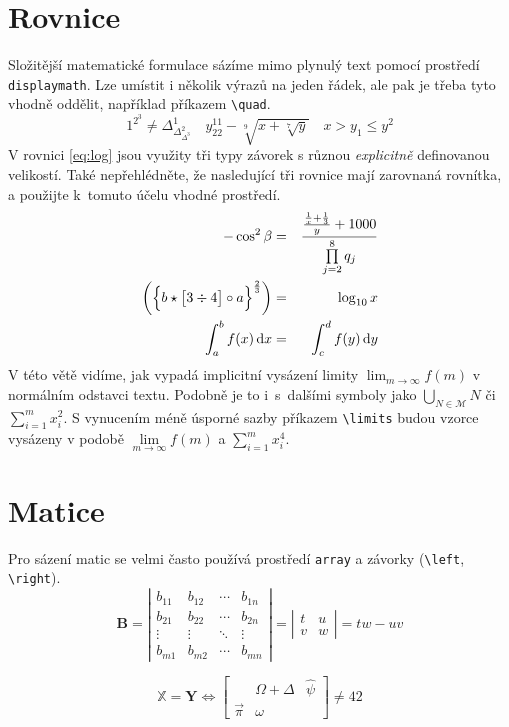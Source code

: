 \documentclass[twocolumn,11pt]{article}
\theoremstyle{plain}
\theoremstyle{plain}
\begin{document}
\section{Rovnice}
Složitější matematické formulace sázíme mimo plynulý text pomocí prostředí \verb|displaymath|.
Lze umístit i několik výrazů na jeden řádek, ale pak je třeba tyto vhodně oddělit,
například příkazem \verb|\quad|.
$$
1^{2^3} \neq \Delta^1_{\Delta^2_{\Delta^3}} \quad
y^{11}_{22} - \sqrt[9]{x + \sqrt[7]{y}} \quad
x > y_1 \leq y^2
$$
V rovnici \eqref{eq:log} jsou využity tři typy závorek s různou \emph{explicitně}
definovanou velikostí. Také nepřehlédněte, že nasledující tři rovnice mají zarovnaná
rovnítka, a použijte k~tomuto účelu vhodné prostředí.
\begin{eqnarray}
- \cos^2 \beta & = & \frac{\frac{\frac{1}{x} + \frac{1}{3}}{y} + 1000}{\prod\limits^8_{j = 2} q_j} \\
\biggl(\Bigl\{b \star \bigl[3 \div 4\bigr] \circ a \Bigr\}^{\frac{2}{3}}\biggr) & = & \log_{10} x\label{eq:log}\\
\int_a^b f(x) \,\mathrm{d}x & = & \int_c^d f(y) \,\mathrm{d}y\label{eq:int}
\end{eqnarray}
V této větě vidíme, jak vypadá
implicitní vysázení limity $\lim_{m \rightarrow \infty} f(m)$ v normálním odstavci textu. Podobně je to i~s~dalšími symboly
jako $\bigcup_{N \in \mathcal{M}}N$ či $\sum_{i=1}^m x_i^2$. S vynucením méně úsporné sazby příkazem \verb|\limits| budou vzorce vysázeny v podobě
$\lim\limits_{m \rightarrow \infty} f(m)$ a $\sum\limits_{i=1}^m x_i^4$.

\section{Matice}
Pro sázení matic se velmi často používá prostředí \texttt{array}
 a závorky (\verb|\left|, \verb|\right|).
$$
\mathbf{B} =
\left|
\begin{array}{cccc}
    b_{11} & b_{12} & \cdots & b_{1n} \\
    b_{21} & b_{22} & \cdots & b_{2n} \\
    \vdots & \vdots & \ddots & \vdots \\
    b_{m1} & b_{m2} & \cdots & b_{mn}
\end{array}
\right|
=
\left|
\begin{array}{cc}
    t & u \\
    v & w
\end{array}
\right|
=
tw - uv
$$

$$
\mathbb{X} = \mathbf{Y} \Longleftrightarrow \left[
\begin{array}{ccc}
      & \Omega + \Delta & \hat{\psi} \\
    \vec{\pi} & \omega &
\end{array}
\right]
\neq 42
$$
\end{document}
